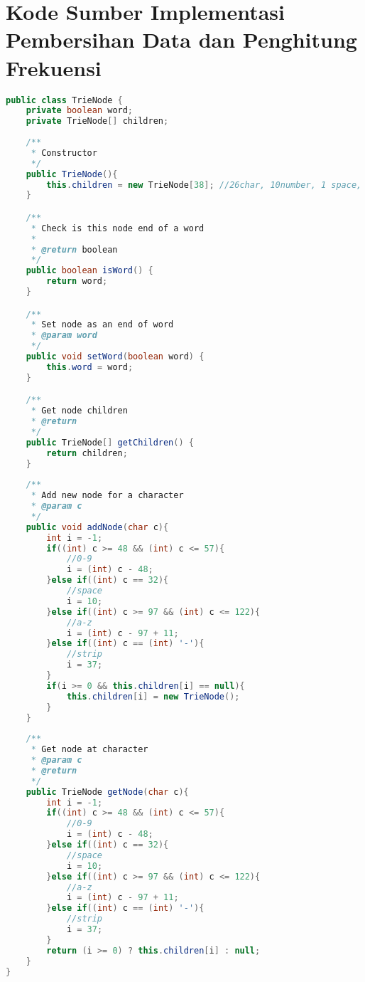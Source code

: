 \chapter{Kode Sumber Implementasi Pembersihan Data dan Penghitung Frekuensi}
\label{app:F}

\singlespacing 
\begin{lstlisting}[language=Java,basicstyle=\tiny,caption=TrieNode.java]
public class TrieNode {
    private boolean word;
    private TrieNode[] children;
    
    /**
     * Constructor
     */
    public TrieNode(){
        this.children = new TrieNode[38]; //26char, 10number, 1 space, 1 stripe
    }

    /**
     * Check is this node end of a word
     * 
     * @return boolean
     */
    public boolean isWord() {
        return word;
    }

    /**
     * Set node as an end of word
     * @param word 
     */
    public void setWord(boolean word) {
        this.word = word;
    }

    /**
     * Get node children
     * @return 
     */
    public TrieNode[] getChildren() {
        return children;
    }
    
    /**
     * Add new node for a character
     * @param c 
     */
    public void addNode(char c){
        int i = -1;
        if((int) c >= 48 && (int) c <= 57){
            //0-9
            i = (int) c - 48;
        }else if((int) c == 32){
            //space
            i = 10;
        }else if((int) c >= 97 && (int) c <= 122){
            //a-z
            i = (int) c - 97 + 11;
        }else if((int) c == (int) '-'){
            //strip
            i = 37;
        }
        if(i >= 0 && this.children[i] == null){
            this.children[i] = new TrieNode();
        }
    }
    
    /**
     * Get node at character
     * @param c
     * @return 
     */
    public TrieNode getNode(char c){
        int i = -1;
        if((int) c >= 48 && (int) c <= 57){
            //0-9
            i = (int) c - 48;
        }else if((int) c == 32){
            //space
            i = 10;
        }else if((int) c >= 97 && (int) c <= 122){
            //a-z
            i = (int) c - 97 + 11;
        }else if((int) c == (int) '-'){
            //strip
            i = 37;
        }
        return (i >= 0) ? this.children[i] : null;
    }
}
\end{lstlisting}

